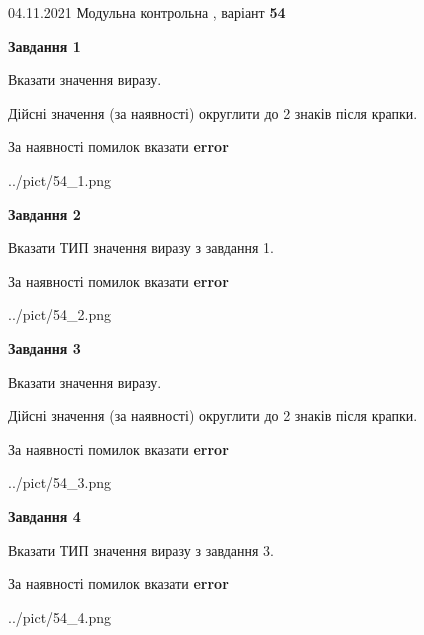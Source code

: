 \documentclass[11pt, ukrainian]{article}
\begin{document}
{04.11.2021 Модульна контрольна , варіант  \No \textbf { 54 }\par}
{
\begin {large}
{\begin {center}\textbf{Завдання 1}\end {center}}\par
Вказати значення виразу. \par
Дійсні значення (за наявності) округлити до 2 знаків після крапки. \par
За наявності помилок вказати \textbf{error}

\begin{center}
	{../pict/54_1.png}
\end{center}
\newpage

{\begin {center}\textbf{Завдання 2}\end {center}}\par
Вказати ТИП значення виразу з завдання 1. \par
За наявності помилок вказати \textbf{error}

\begin{center}
	{../pict/54_2.png}
\end{center}
\newpage

{\begin {center}\textbf{Завдання 3}\end {center}}\par
Вказати значення виразу. \par
Дійсні значення (за наявності) округлити до 2 знаків після крапки. \par
За наявності помилок вказати \textbf{error}

\begin{center}
	{../pict/54_3.png}
\end{center}
\newpage

{\begin {center}\textbf{Завдання 4}\end {center}}\par
Вказати ТИП значення виразу з завдання 3. \par
За наявності помилок вказати \textbf{error}

\begin{center}
	{../pict/54_4.png}
\end{center}
\newpage


\end{large}}
\end{document}
